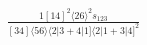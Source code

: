 \documentclass[varwidth, border=5pt]{standalone}
\begin{document}
\begin{my}
$\begin{gathered}
\scriptscriptstyle\frac{1[14]^2⟨26⟩^2s_{123}}{[34]⟨56⟩⟨2|3+4|1]⟨2|1+3|4]^2}
\end{gathered}$
\end{my}
\end{document}
